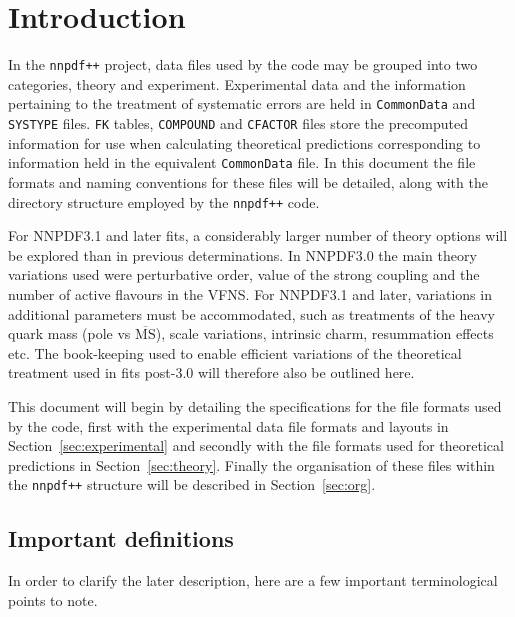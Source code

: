 \documentclass[11pt]{article}
\begin{document}
\clearpage

\section{Introduction}

In the {\tt nnpdf++} project, data files used by the code may be grouped into two categories, theory and experiment. Experimental data and the information pertaining to the treatment of systematic errors are held in {\tt CommonData} and {\tt SYSTYPE} files. {\tt FK} tables, {\tt COMPOUND} and {\tt CFACTOR} files store the precomputed information for use when calculating theoretical predictions corresponding to information held in the equivalent {\tt CommonData} file. In this document the file formats and naming conventions for these files will be detailed, along with the directory structure employed by the {\tt nnpdf++} code.

For NNPDF3.1 and later fits, a considerably larger number of theory options will be explored than in previous determinations. In NNPDF3.0 the main theory variations used were perturbative order, value of the strong coupling and the number of active flavours in the VFNS. For NNPDF3.1 and later, variations in additional parameters must be accommodated, such as treatments of the heavy quark mass (pole vs $\overline{\mathrm{MS}}$), scale variations,  intrinsic charm, resummation effects etc. The book-keeping used to enable efficient variations of the theoretical treatment used in fits post-3.0 will therefore also be outlined here.

This document will begin by detailing the specifications for the file formats used by the code, first with the experimental data file formats and layouts in Section~\ref{sec:experimental} and secondly with the file formats used for theoretical predictions in Section~\ref{sec:theory}. Finally the organisation of these files within the {\tt nnpdf++} structure will be described in Section~\ref{sec:org}.

\subsection{Important definitions}
In order to clarify the later description, here are a few important terminological points to note.
\end{document}

